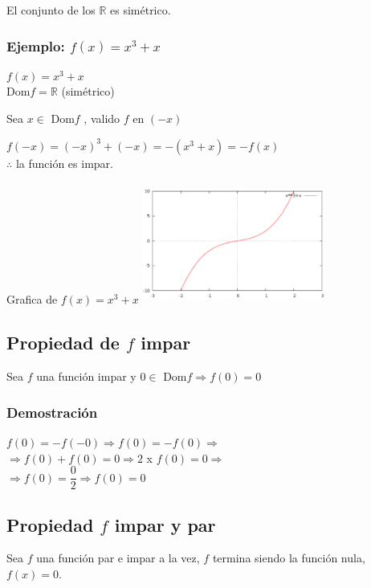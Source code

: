 El conjunto de los $\mathbb{R}$ es simétrico.
\subsubsection{Ejemplo: $f(x)=x^{3}+x$}
\hfill
\begin{minipage}{.45\textwidth}
$f(x)=x^{3}+x$\\Dom$f=\mathbb{R}$ (simétrico)

Sea $x \in $ Dom$f$ , valido $f$ en $(-x)$
\begin{center}
$f(-x) = (-x)^{3}+(-x)=-(x^{3}+x)=-f(x) $\\ $\therefore$ la función es impar.
\end{center}
\end{minipage}
\hfill
\begin{minipage}{.45\textwidth}
\begin{center}
Grafica de $f(x)=x^{3}+x$
\includegraphics[height=4cm,width=6cm]{fxxx+x.eps} 
\end{center}
\end{minipage}
\hfill

\subsection{Propiedad de $f$ impar}
Sea $f$ una función impar y $0 \in $ Dom$f \Rightarrow f(0)=0$
\subsubsection{Demostración}
\begin{center}
$f(0)=-f(-0)\Rightarrow f(0)=-f(0) \Rightarrow$ \\
$\Rightarrow f(0)+f(0)=0 \Rightarrow 2 $ x $f(0)=0 \Rightarrow $\\
$\Rightarrow f(0)=\dfrac{0}{2} \Rightarrow f(0)=0$
\end{center} 
\subsection{Propiedad $f$ impar y par}
Sea $f$ una función par e impar a la vez, $f$ termina siendo la función nula, $f(x)=0$.
